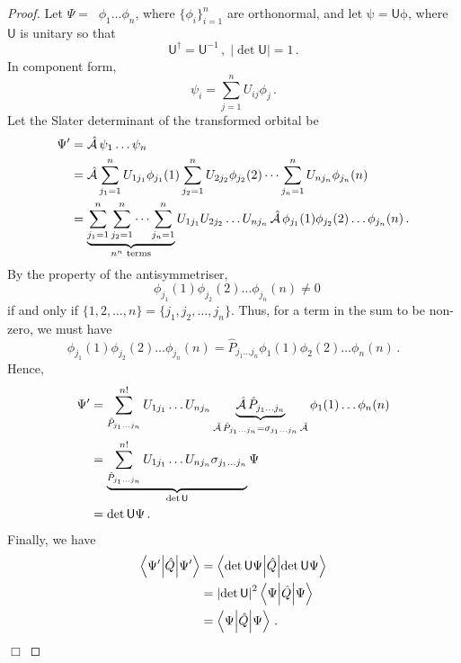 \documentclass{article}
\theoremstyle{plain}\theoremheaderfont{\normalfont\itshape}\theorembodyfont{\rmfamily}\theoremseparator{.}\newtheorem*{rem}{Remark}\newtheorem*{ex}{Example}\newtheorem*{proof}{Proof}\newtheorem*{altp}{Alternative proof}
\theoremstyle{plain}\theoremheaderfont{\normalfont\bfseries}\theorembodyfont{\rmfamily}\theoremseparator{.}\newtheorem{thm}{Theorem}[section]\newtheorem{lem}[thm]{Lemma}\newtheorem{prop}[thm]{Proposition}\newtheorem*{cor}{Corollary}\newtheorem{defn}[thm]{Definition}\newtheorem{clm}[thm]{Claim}\newtheorem{clminproof}{Claim}
\theoremstyle{break}\theoremheaderfont{\normalfont\itshape}\theorembodyfont{\rmfamily}\theoremseparator{.\medskip}\newtheorem*{proofskip}{Proof}\newtheorem*{exs}{Examples}\newtheorem*{rems}{Remarks}
\theoremstyle{break}\theoremheaderfont{\normalfont\bfseries}\theorembodyfont{\rmfamily}\theoremseparator{.\medskip}\newtheorem{lemskip}[thm]{Lemma}\newtheorem{defnskip}[thm]{Definition}\newtheorem{propskip}[thm]{Proposition}\newtheorem{thmskip}[thm]{Theorem}
\numberwithin{equation}{section}
\newcommand{\qed}{\hfill\ensuremath{\Box}}
\newcommand{\expval}[2]{\left\langle #2 \middle| #1 \middle| #2 \right\rangle}
\newcommand{\vb}[1]{\bm{\mathrm{#1}}}
\newcommand{\abs}[1]{\left| #1 \right|}
\DeclareMathOperator{\antisymm}{\hat{\mathcal{A}}}
\begin{document}
    \begin{proof}
        Let \(\Psi=\antisymm\phi_1\dots\phi_n\), where \(\{\phi_i\}_{i=1}^{n}\) are orthonormal, and let \(\vb{\psi}=\mathsf{U}\vb{\phi}\), where \(\mathsf{U}\) is unitary so that
        \begin{equation}
            \mathsf{U}^\dagger=\mathsf{U}^{-1}\,,\; \abs{\det\mathsf{U}}=1\,.
        \end{equation}
        In component form,
        \begin{equation}
            \psi_i=\sum_{j=1}^{n}U_{ij}\phi_j\,.
        \end{equation}
        Let the Slater determinant of the transformed orbital be
        \begin{align}
            \Psi'&=\antisymm\psi_1\dots\psi_n\notag\\
            &=\antisymm\sum_{j_1=1}^{n}U_{1j_1}\phi_{j_1}(1)\sum_{j_2=1}^{n}U_{2j_2}\phi_{j_2}(2)\dots\sum_{j_n=1}^{n}U_{nj_n}\phi_{j_n}(n)\notag\\
            &=\underbrace{\sum_{j_1=1}^{n}\sum_{j_2=1}^{n}\dots\sum_{j_n=1}^{n}}_{n^n\text{ terms}}U_{1j_1}U_{2j_2}\dots U_{nj_n}\antisymm\phi_{j_1}(1)\phi_{j_2}(2)\dots\phi_{j_n}(n)\,.
        \end{align}
        By the property of the antisymmetriser,
        \begin{equation}
            \antisymm\phi_{j_1}(1)\phi_{j_2}(2)\dots\phi_{j_n}(n)\ne 0
        \end{equation}
        if and only if \(\{1,2,\dots,n\}=\{j_1,j_2,\dots,j_n\}\). Thus, for a term in the sum to be non-zero, we must have
        \begin{equation}
            \phi_{j_1}(1)\phi_{j_2}(2)\dots\phi_{j_n}(n)=\hat{P}_{j_1\dots j_n}\phi_1(1)\phi_2(2)\dots\phi_n(n)\,.
        \end{equation}
        Hence,
        \begin{align}
            \Psi'&=\sum_{\hat{P}_{j_1\dots j_n}}^{n!}U_{1j_1}\dots U_{nj_n}\underbrace{\antisymm\hat{P}_{j_1\dots j_n}}_{\antisymm\hat{P}_{j_1\dots j_n}=\sigma_{j_1\dots j_n}\antisymm}\phi_1(1)\dots\phi_n(n)\notag\\
            &=\underbrace{\sum_{\hat{P}_{j_1\dots j_n}}^{n!}U_{1j_1}\dots U_{nj_n}\sigma_{j_1\dots j_n}}_{\det\mathsf{U}}\Psi\notag\\
            &=\det\mathsf{U} \Psi\,.
        \end{align}
        Finally, we have
        \begin{align}
            \expval{\hat{Q}}{\Psi'}&=\expval{\hat{Q}}{\det\mathsf{U}\Psi}\notag\\
            &=\abs{\det\mathsf{U}}^2\expval{\hat{Q}}{\Psi}\notag\\
            &=\expval{\hat{Q}}{\Psi}\,.
        \end{align}\qed
    \end{proof}
\end{document}
